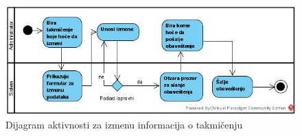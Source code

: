\documentclass[../../main.tex]{subfiles}
\begin{document}
\begin{figure}[!ht]
\begin{center}
\includegraphics[scale=0.55]{sections/images/dijagram_aktivnosti_izmena_podataka_takmicenje.jpg}
\end{center}
\caption{Dijagram aktivnosti za izmenu informacija o takmičenju}
\label{fig:kontekst}
\end{figure}
\end{document}
